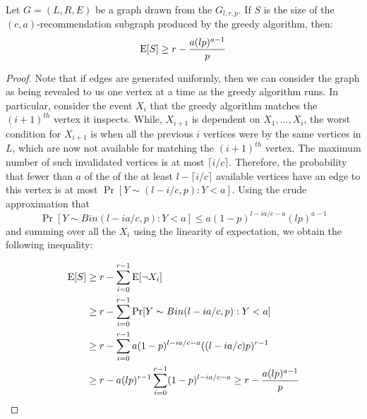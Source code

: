 \begin{thm}
Let $G=(L,R,E)$ be a graph drawn from the $G_{l,r,p}$. If $S$ is the size of the $(c,a)$-recommendation subgraph produced by the greedy algorithm, then:
\[ \text{E}[S] \geq r - \frac{a(lp)^{a-1}}{p}\]
\end{thm}
\begin{proof}
Note that if edges are generated uniformly, then we can consider the
graph as being revealed to us one vertex at a time as the greedy
algorithm runs. In particular, consider the event $X_i$ that the
greedy algorithm matches the $(i+1)^{th}$ vertex it inspects. While,
$X_{i+1}$ is dependent on $X_1,\ldots, X_i$, the worst condition for
$X_{i+1}$ is when all the previous $i$ vertices were by the same
vertices in $L$, which are now not available for matching the
$(i+1)^{th}$ vertex. The maximum number of such invalidated vertices
is at most $\lceil i/c \rceil$. Therefore, the probability that fewer
than $a$ of the of the at least $l-\lceil i/c \rceil $ available 
vertices have an edge to this vertex is at most $\Pr[Y\sim (l-i/c,p): Y < a]$.
Using the crude approximation that
\[ \Pr[Y\sim Bin(l-ia/c,p): Y < a] \leq a(1-p)^{l-ia/c-a}(lp)^{a-1}\]
and summing over all the $X_i$ using the linearity of expectation,
we obtain the following inequality:

\begin{align*}
      \text{E}[S]
&\geq r - \sum_{i=0}^{r-1} \text{E}[\lnot X_i] \\
&\geq r - \sum_{i=0}^{r-1} \Pr[Y \sim Bin(l-ia/c,p): Y < a] \\
&\geq r - \sum_{i=0}^{r-1}a(1-p)^{l-ia/c-a}((l-ia/c)p)^{r-1} \\
&\geq r - a(lp)^{r-1}\sum_{i=0}^{r-1}(1-p)^{l-ia/c-a} \geq r - \frac{a(lp)^{a-1}}{p}\\
\end{align*}
\end{proof} 
